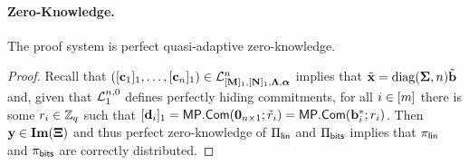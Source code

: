 \paragraph{Zero-Knowledge.}

\begin{theorem}
The proof system is perfect quasi-adaptive zero-knowledge.
\end{theorem}

\begin{proof}
Recall that $([\mathbf{c}_1]_1,\ldots,[\mathbf{c}_n]_1)\in\mathcal{L}^n_{[\mathbf{{M}}]_1,[\mathbf{{N}}]_1,\mathbf{{\Lambda}},{\boldsymbol \alpha}}$ implies that
$
{\tilde{\mathbf{x}}}
=\mathrm{diag}(\mathbf{{\Sigma}},n){\tilde{\mathbf{b}}}
$
and, given that $\mathcal{L}_1^{n,0}$ defines perfectly hiding commitments, for all $i\in[{m}]$ there is some $r_i\in\mathbb{Z}_q$ such that
$[\mathbf{d}_i]_1=\mathsf{MP}.\mathsf{Com}(\mathbf{{0}}_{n\times1};\tilde{{r}}_i)=\mathsf{MP}.\mathsf{Com}(\mathbf{b}_i^*;r_i)$. Then $\mathbf{y}\in\mathbf{Im}(\mathbf{{\Xi}})$ and thus perfect zero-knowledge of $\Pi_{\mathsf{lin}}$ and $\Pi_{\mathsf{bits}}$ implies that $\pi_{\mathsf{lin}}$ and $\pi_{\mathsf{bits}}$ are correctly distributed.
\end{proof}
